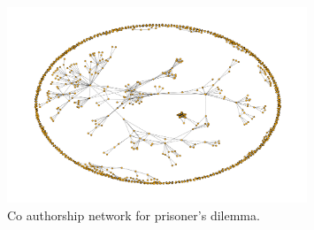 \documentclass{article}
\theoremstyle{definition}
\begin{document}
\begin{figure}[!hbtp]
    \centering
    \includegraphics[width=0.8\textwidth]{./assets/images/co-authors-network.pdf}
    \caption{Co authorship network for prisoner's dilemma.}\label{fig:authors_network}
\end{figure}
\end{document}
